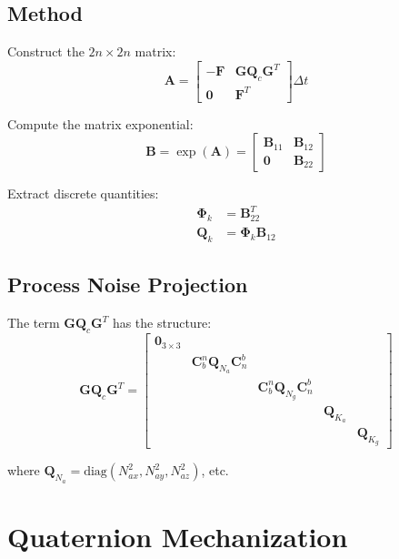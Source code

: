 \documentclass[11pt,a4paper]{article}
\newcommand{\mat}[1]{\mathbf{#1}}
\newcommand{\vect}[1]{\boldsymbol{#1}}
\begin{document}
\subsection{Method}

Construct the $2n \times 2n$ matrix:
\begin{equation}
    \mat{A} = \begin{bmatrix}
        -\mat{F} & \mat{G}\mat{Q}_c\mat{G}^T \\
        \mat{0} & \mat{F}^T
    \end{bmatrix} \Delta t
\end{equation}

Compute the matrix exponential:
\begin{equation}
    \mat{B} = \exp(\mat{A}) = \begin{bmatrix}
        \mat{B}_{11} & \mat{B}_{12} \\
        \mat{0} & \mat{B}_{22}
    \end{bmatrix}
\end{equation}

Extract discrete quantities:
\begin{align}
    \vect{\Phi}_k &= \mat{B}_{22}^T \\
    \mat{Q}_k &= \vect{\Phi}_k \mat{B}_{12}
\end{align}

\subsection{Process Noise Projection}

The term $\mat{G}\mat{Q}_c\mat{G}^T$ has the structure:
\begin{equation}
    \mat{G}\mat{Q}_c\mat{G}^T = \begin{bmatrix}
        \mat{0}_{3\times3} & & & & \\
        & \mat{C}_b^n\mat{Q}_{N_a}\mat{C}_n^b & & & \\
        & & \mat{C}_b^n\mat{Q}_{N_g}\mat{C}_n^b & & \\
        & & & \mat{Q}_{K_a} & \\
        & & & & \mat{Q}_{K_g}
    \end{bmatrix}
\end{equation}

where $\mat{Q}_{N_a} = \text{diag}(N_{ax}^2, N_{ay}^2, N_{az}^2)$, etc.

\section{Quaternion Mechanization}
\end{document}
